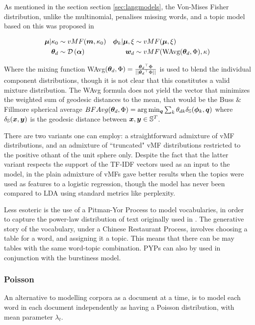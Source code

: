 As mentioned in the section section \ref{sec:langmodels}, the Von-Mises Fisher distribution, unlike the multinomial, penalises missing words, and a topic model based on this was proposed in \cite{Reisinger2010}

\begin{align}
\bm \mu | \kappa_0 & \sim  vMF(\bm m, \kappa_0) &
\bm \phi_k | \bm \mu, \xi & \sim  vMF(\bm \mu, \xi) \\
{ \bm \theta_d } & \sim  \mathcal{D} \left( {\bm \alpha} \right) &
{ \bm w_d } & \sim  vMF(\text{WAvg}({ \bm \theta_d }, \Phi), \kappa) 
\end{align} 

Where the mixing function WAvg$({ \bm \theta_d }, \Phi) = \frac{{ \bm \theta_d }^\top\Phi}{||{ \bm \theta_d }^\top\Phi||}$ is used to blend the individual component distributions, though it is not clear that this constitutes a valid mixture distribution.  The WAvg formula does not yield the vector that minimizes the weighted sum of geodesic distances to the mean, that would be the  Buss \& Fillmore spherical average $BFAvg({ \bm \theta_d },\Phi) = \arg \min_{\bm q} \sum_k { \theta_{dk} } \delta_\mathbb{S}(\bm \phi_k, \bm q)$ where $\delta_\mathbb{S}(\bm x, \bm y)$ is the geodesic distance between $\bm x, \bm y \in \mathbb{S}^T$. 

There are two variants one can employ: a straightforward admixture of vMF distributions, and an admixture of ``truncated" vMF distributions restricted to the positive othant of the unit sphere only. Despite the fact that the latter variant respects the support of the TF-IDF vectors used as an input to the model, in \cite{Reisinger2010} the plain admixture of vMFs gave better results when the topics were used as features to a logistic regression, though the model has never been compared to LDA using standard metrics like perplexity.

Less esoteric is the use of a Pitman-Yor Process to model vocabularies, in order to capture the power-law distribution of text originally used in \cite{Sato2010}. The generative story of the vocabulary, under a Chinese Restaurant Process, involves choosing a table for a word, and assigning it a topic. This means that there can be may tables with the same word-topic combination. PYPs can also by used in conjunction with the burstiness model\cite{Buntine2014}.


%
%

\subsubsection*{Poisson}
An alternative to modelling corpora as a document at a time, is to model each word in each document independently as having a Poisson distribution, with mean parameter $\lambda_t$. 

